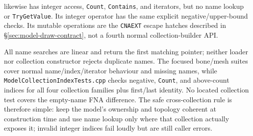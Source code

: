  likewise has integer access, \texttt{Count},
\texttt{Contains}, and iterators, but no name lookup or \texttt{TryGetValue}. Its
integer operator has the same explicit negative/upper-bound checks. Its mutable operations are the
\texttt{CNAEXT} escape hatches described in \S\ref{sec:model-draw-contract}, not a fourth normal
collection-builder API.

All name searches are linear and return the first matching pointer; neither loader nor collection
constructor rejects duplicate names. The focused bone/mesh suites cover normal
name/index/iterator behaviour and missing names, while \texttt{ModelCollectionIndexTests.cpp}
checks negative, \texttt{Count}, and above-count indices for all four collection families plus
first/last identity. No located collection test covers the empty-name FNA difference. The safe
cross-collection rule is therefore simple: keep the model's ownership and topology coherent at
construction time and use name lookup only where that collection actually exposes it; invalid
integer indices fail loudly but are still caller errors.
